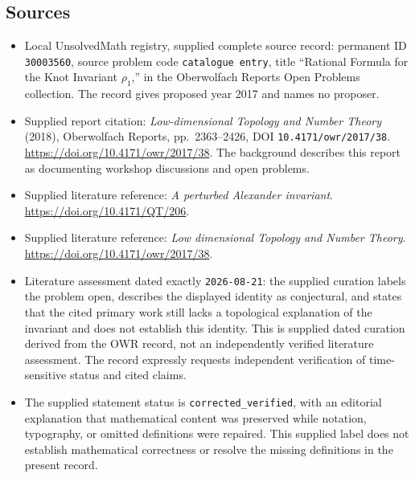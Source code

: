 \documentclass[11pt]{article}
\begin{document}
\subsection{Sources}
\begin{itemize}
\item Local UnsolvedMath registry, supplied complete source record: permanent ID \texttt{30003560}, source problem code \texttt{catalogue entry}, title ``Rational Formula for the Knot Invariant $\rho_1$,'' in the Oberwolfach Reports Open Problems collection. The record gives proposed year 2017 and names no proposer.
\item Supplied report citation: \emph{Low-dimensional Topology and Number Theory} (2018), Oberwolfach Reports, pp.~2363--2426, DOI \texttt{10.4171/owr/2017/38}. \url{https://doi.org/10.4171/owr/2017/38}. The background describes this report as documenting workshop discussions and open problems.
\item Supplied literature reference: \emph{A perturbed Alexander invariant}. \url{https://doi.org/10.4171/QT/206}.
\item Supplied literature reference: \emph{Low dimensional Topology and Number Theory}. \url{https://doi.org/10.4171/owr/2017/38}.
\item Literature assessment dated exactly \texttt{2026-08-21}: the supplied curation labels the problem open, describes the displayed identity as conjectural, and states that the cited primary work still lacks a topological explanation of the invariant and does not establish this identity. This is supplied dated curation derived from the OWR record, not an independently verified literature assessment. The record expressly requests independent verification of time-sensitive status and cited claims.
\item The supplied statement status is \texttt{corrected\_verified}, with an editorial explanation that mathematical content was preserved while notation, typography, or omitted definitions were repaired. This supplied label does not establish mathematical correctness or resolve the missing definitions in the present record.
\end{itemize}
\end{document}

